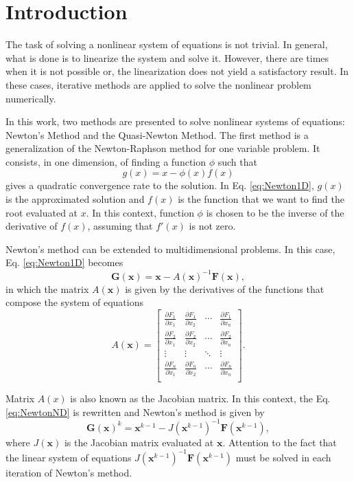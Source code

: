 \section{Introduction} \label{sec:introduction}
The task of solving a nonlinear system of equations is not trivial. In general, what is done is to linearize the system and solve it. However, there are times when it is not possible or, the linearization does not yield a satisfactory result. In these cases, iterative methods are applied to solve the nonlinear problem numerically. 

In this work, two methods are presented to solve nonlinear systems of equations: Newton's Method and the Quasi-Newton Method. The first method is a generalization of the Newton-Raphson method for one variable problem. It consists, in one dimension, of finding a function $\phi$ such that 
\begin{equation}
    g(x) = x - \phi(x) f(x)
    \label{eq:Newton1D}
\end{equation}
gives a quadratic convergence rate to the solution. In Eq. \eqref{eq:Newton1D}, $g(x)$ is the approximated solution and $f(x)$ is the function that we want to find the root evaluated at $x$. In this context, function $\phi$ is chosen to be the inverse of the derivative of $f(x)$, assuming that $f'(x)$ is not zero.

Newton's method can be extended to multidimensional problems. In this case, Eq. \eqref{eq:Newton1D} becomes
\begin{equation}
    \bm{G}(\bm{x}) = \bm{x} - A(\bm{x})^{-1} \bm{F}(\bm{x}),
    \label{eq:NewtonND}
\end{equation} 
in which the matrix $A(\bm{x})$ is given by the derivatives of the functions that compose the system of equations 
\begin{equation}
    A(\bm{x}) = \begin{bmatrix}
        \frac{\partial F_1}{\partial x_1} & \frac{\partial F_1}{\partial x_2} & \cdots & \frac{\partial F_1}{\partial x_n} \\
        \frac{\partial F_2}{\partial x_1} & \frac{\partial F_2}{\partial x_2} & \cdots & \frac{\partial F_2}{\partial x_n} \\
        \vdots & \vdots & \ddots & \vdots \\
        \frac{\partial F_n}{\partial x_1} & \frac{\partial F_n}{\partial x_2} & \cdots & \frac{\partial F_n}{\partial x_n} \\
    \end{bmatrix}.
\end{equation}

Matrix $A(x)$ is also known as the Jacobian matrix. In this context, the Eq. \eqref{eq:NewtonND} is rewritten and Newton's method is given by 
\begin{equation}
    \bm{G}(\bm{x})^{k} = \bm{x}^{k-1} - J(\bm{x}^{k-1})^{-1} \bm{F}(\bm{x}^{k-1}),
    \label{eq:NewtonNDJ}
\end{equation}
where $J(\bm{x})$ is the Jacobian matrix evaluated at $\bm{x}$. Attention to the fact that the linear system of equations $J(\bm{x}^{k-1})^{-1}\bm{F}(\bm{x}^{k-1})$ must be solved in each iteration of Newton's method.



